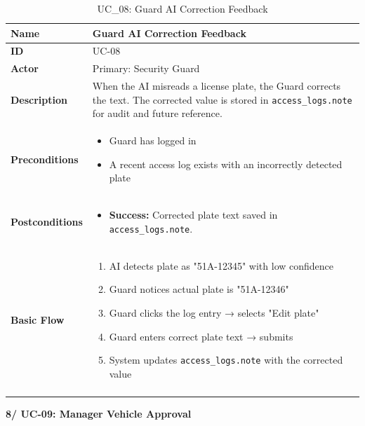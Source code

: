 \documentclass[a4paper]{article}
\newlength{\ucLeft}
\begin{document}
\begin{longtable}{|>{\bfseries}p{\ucLeft}|
                p{\dimexpr\textwidth-\ucLeft-4\tabcolsep-3\arrayrulewidth\relax}|}
\hline
Name & Guard AI Correction Feedback \\ \hline
ID & UC-08 \\ \hline
Actor & Primary: Security Guard \\ \hline
Description & When the AI misreads a license plate, the Guard corrects the text. The corrected value is stored in \texttt{access\_logs.note} for audit and future reference.\\ \hline
Preconditions &
\begin{itemize}[leftmargin=*, nosep, topsep=0pt, partopsep=0pt, parsep=0pt]
    \item Guard has logged in
    \item A recent access log exists with an incorrectly detected plate
\end{itemize}
\\ \hline
Postconditions &
\begin{itemize}[leftmargin=*, nosep, topsep=0pt, partopsep=0pt, parsep=0pt, after=\strut]
    \item \textbf{Success:} Corrected plate text saved in \texttt{access\_logs.note}.
\end{itemize}
\\ \hline
Basic Flow & 
\begin{enumerate}[leftmargin=*, nosep, topsep=0pt, partopsep=0pt, parsep=0pt]
    \item AI detects plate as "51A-12345" with low confidence
    \item Guard notices actual plate is "51A-12346"
    \item Guard clicks the log entry → selects "Edit plate"
    \item Guard enters correct plate text → submits
    \item System updates \texttt{access\_logs.note} with the corrected value
\end{enumerate}
\\ \hline
\caption{UC\_08: Guard AI Correction Feedback}\label{tab:uc08}
\end{longtable}

\newpage
\noindent \textbf{8/ UC-09: Manager Vehicle Approval}
\setlength{\tabcolsep}{6pt}
\renewcommand{\arraystretch}{1.2}
\setlength{\ucLeft}{30mm}
\end{document}
